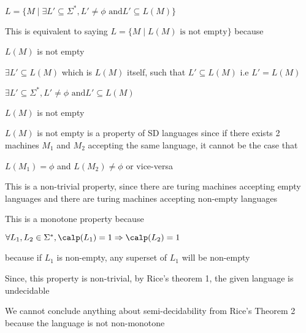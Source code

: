 $
L = \{
    M \mid \exists L' \subseteq \Sigma^*, L' \not = \phi \text{ and}
    L' \subseteq L(M)
\}
$

This is equivalent to saying 
$
L = \{
    M \mid L(M) \text{ is not empty}
\}
$
because

$L(M)$ is not empty

\imp
$\exists L' \subseteq L(M)$ which is $L(M)$ itself, such that $L' \subseteq L(M)$ i.e $L' = L(M)$

$
\exists L' \subseteq \Sigma^*, L' \not = \phi \text{ and}
    L' \subseteq L(M)
    $

\imp
$L(M)$ is not empty

$L(M)$ is not empty is a property of SD languages since
if there exists 2 machines $M_1$ and $M_2$ accepting the same language, it cannot be the case that 

$L(M_1) = \phi$ and $L(M_2) \not = \phi$ or vice-versa


This is a non-trivial property, since there are turing machines accepting empty languages and there are turing machines accepting non-empty languages

This is a monotone property because

$\forall L_1, L_2 \in \Sigma^*, \calp(L_1) = 1 \Rightarrow \calp(L_2) = 1$

because if $L_1$ is non-empty, any superset of $L_1$ will be non-empty

Since, this property is non-trivial, by Rice's theorem 1, the given language is undecidable

We cannot conclude anything about semi-decidability from Rice's Theorem 2 because the language is not non-monotone







